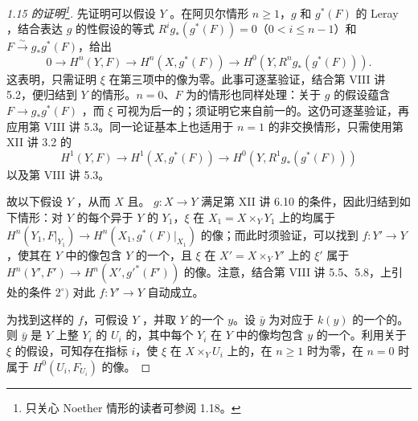 \begin{proof}[1.15 的证明\footnote{只关心 Noether 情形的读者可参阅 1.18。}]
先证明可以假设 $Y$ 。在阿贝尔情形 $n\geq1$，$g$ 和 $g^*(F)$ 的 Leray ，结合表达 $g$ 的性假设的等式 $R^ig_*(g^*(F))=0$（$0<i\leq n-1$）和 $F\xrightarrow{\sim}g_*g^*(F)$，给出
\[0\longrightarrow H^n(Y,F)\longrightarrow H^n(X,g^*(F))\longrightarrow H^0(Y,R^ng_*(g^*(F))).\]
这表明，只需证明 $\xi$ 在第三项中的像为零。此事可逐茎验证，结合第 VIII 讲 5.2，便归结到 $Y$ 的情形。$n=0$、$F$ 为的情形也同样处理：关于 $g$ 的假设蕴含 $F\to g_*g^*(F)$ ，而 $\xi$ 可视为后一的；须证明它来自前一的。这仍可逐茎验证，再应用第 VIII 讲 5.3。同一论证基本上也适用于 $n=1$ 的非交换情形，只需使用第 XII 讲 3.2 的
\[H^1(Y,F)\longrightarrow H^1(X,g^*(F))\longrightarrow H^0(Y,R^1g_*(g^*(F)))\]
以及第 VIII 讲 5.3。

故以下假设 $Y$ ，从而 $X$ 且。 $g:X\to Y$ 满足第 XII 讲 6.10 的条件，因此归结到如下情形：对 $Y$ 的每个异于 $Y$ 的 $Y_1$，$\xi$ 在 $X_1=X\times_Y Y_1$ 上的均属于 $H^n(Y_1,F|_{Y_1})\to H^n(X_1,g^*(F)|_{X_1})$ 的像；而此时须验证，可以找到 $f:Y'\to Y$，使其在 $Y$ 中的像包含 $Y$ 的一个，且 $\xi$ 在 $X'=X\times_Y Y'$ 上的 $\xi'$ 属于 $H^n(Y',F')\to H^n(X',g'^*(F'))$ 的像。注意，结合第 VIII 讲 5.5、5.8，上引处的条件 $2^\circ)$ 对此 $f:Y'\to Y$ 自动成立。

为找到这样的 $f$，可假设 $Y$ ，并取 $Y$ 的一个 $y$。设 $\bar y$ 为对应于 $k(y)$ 的一个的。则 $\bar y$ 是 $Y$ 上整 $Y_i$ 的 $U_i$ 的，其中每个 $Y_i$ 在 $Y$ 中的像均包含 $y$ 的一个。利用关于 $\xi$ 的假设，可知存在指标 $i$，使 $\xi$ 在 $X\times_Y U_i$ 上的，在 $n\geq1$ 时为零，在 $n=0$ 时属于 $H^0(U_i,F_{U_i})$ 的像。


\end{proof}
